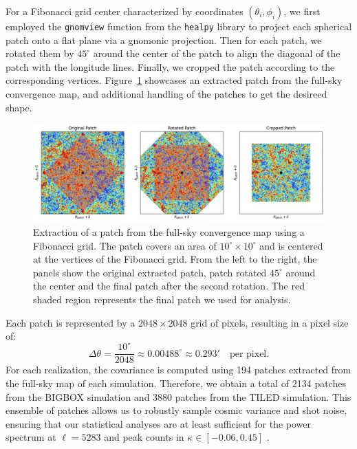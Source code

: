 For a Fibonacci grid center characterized by coordinates \( (\theta_i, \phi_i) \), we first employed the \texttt{gnomview} function from the \texttt{healpy} library \citep{Zonca2019} to project each spherical patch onto a flat plane via a gnomonic projection. Then for each patch, we rotated them by $45^\circ$ around the center of the patch to align the diagonal of the patch with the longitude lines. Finally, we cropped the patch according to the corresponding vertices. Figure~\ref{fig:fibonacci_extraction} showcases an extracted patch from the full-sky convergence map, and additional handling of the patches to get the desireed shape.
\begin{figure}
    \centering
    \includegraphics[width=\textwidth]{figures/fibonacci_extraction.png}
    \caption[Extraction of a patch from the full-sky convergence map using a Fibonacci grid]{Extraction of a patch from the full-sky convergence map using a Fibonacci grid. The patch covers an area of $10^\circ \times 10^\circ$ and is centered at the vertices of the Fibonacci grid. From the left to the right, the panels show the original extracted patch, patch rotated $45^\circ$ around the center and the final patch after the second rotation. The red shaded region represents the final patch we used for analysis.
    } \label{fig:fibonacci_extraction}
\end{figure}

Each patch is represented by a $2048 \times 2048$ grid of pixels, resulting in a pixel size of:
\begin{equation}
    \Delta \theta = \frac{10^\circ}{2048} \approx 0.00488^\circ \approx 0.293' \quad \text{per pixel}.
\end{equation}
For each realization, the covariance is computed using 194 patches extracted from the full-sky map of each simulation.
Therefore, we obtain a total of 2134 patches from the BIGBOX simulation and 3880 patches from the TILED simulation. This ensemble of patches allows us to robustly sample cosmic variance and shot noise, ensuring that our statistical analyses are at least sufficient for the power spectrum at $\ell = 5283$ and peak counts in $ \kappa \in \left[-0.06, 0.45\right]$ \citep{2016PhRvD..93f3524P}.

